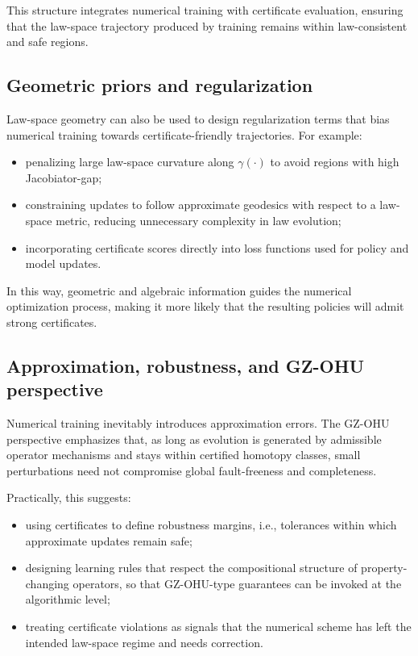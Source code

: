 \documentclass[11pt]{book}
\theoremstyle{plain}
\theoremstyle{definition}
\theoremstyle{remark}
\begin{document}
This structure integrates numerical training with certificate
evaluation, ensuring that the law-space trajectory produced by
training remains within law-consistent and safe regions.

\subsection*{Geometric priors and regularization}

Law-space geometry can also be used to design regularization terms
that bias numerical training towards certificate-friendly
trajectories. For example:
\begin{itemize}
  \item penalizing large law-space curvature along $\gamma(\cdot)$
        to avoid regions with high Jacobiator-gap;
  \item constraining updates to follow approximate geodesics with
        respect to a law-space metric, reducing unnecessary
        complexity in law evolution;
  \item incorporating certificate scores directly into loss
        functions used for policy and model updates.
\end{itemize}

In this way, geometric and algebraic information guides the
numerical optimization process, making it more likely that the
resulting policies will admit strong certificates.

\subsection*{Approximation, robustness, and GZ-OHU perspective}

Numerical training inevitably introduces approximation errors. The
GZ-OHU perspective emphasizes that, as long as evolution is
generated by admissible operator mechanisms and stays within
certified homotopy classes, small perturbations need not compromise
global fault-freeness and completeness.

Practically, this suggests:
\begin{itemize}
  \item using certificates to define robustness margins, i.e.,
        tolerances within which approximate updates remain safe;
  \item designing learning rules that respect the compositional
        structure of property-changing operators, so that GZ-OHU-type
        guarantees can be invoked at the algorithmic level;
  \item treating certificate violations as signals that the
        numerical scheme has left the intended law-space regime and
        needs correction.
\end{itemize}
\end{document}

